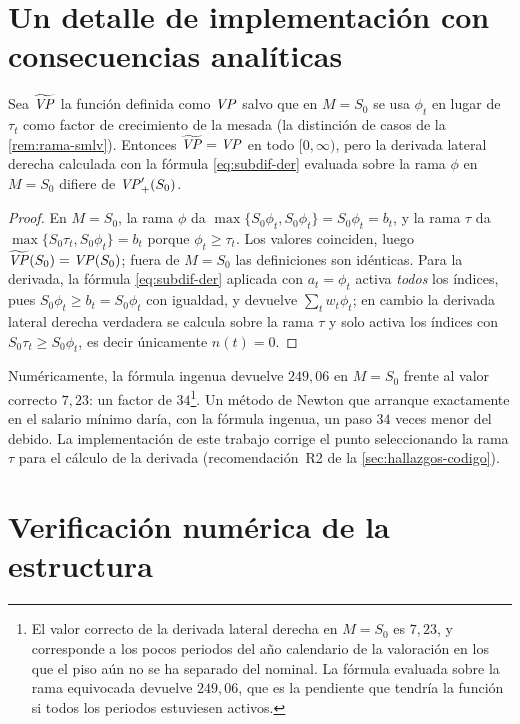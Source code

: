 \section{Un detalle de implementación con consecuencias analíticas}

\begin{proposition}
\label{prop:continuidad-rama}
Sea $\widetilde{\mathit{VP}}$ la función definida como $\mathit{VP}$ salvo que en $M=S_0$ se usa
$\phi_t$ en lugar de $\tau_t$ como factor de crecimiento de la mesada (la
distinción de casos de la \cref{rem:rama-smlv}). Entonces
$\widetilde{\mathit{VP}}=\mathit{VP}$ en todo $[0,\infty)$, pero la derivada lateral derecha
calculada con la fórmula \cref{eq:subdif-der} evaluada sobre la rama $\phi$ en
$M=S_0$ difiere de $\mathit{VP}'_+(S_0)$.
\end{proposition}
\begin{proof}
En $M=S_0$, la rama $\phi$ da $\max\{S_0\phi_t,S_0\phi_t\}=S_0\phi_t=b_t$, y la
rama $\tau$ da $\max\{S_0\tau_t,S_0\phi_t\}=b_t$ porque $\phi_t\ge\tau_t$. Los
valores coinciden, luego $\widetilde{\mathit{VP}}(S_0)=\mathit{VP}(S_0)$; fuera de $M=S_0$ las
definiciones son idénticas. Para la derivada, la fórmula \cref{eq:subdif-der}
aplicada con $a_t=\phi_t$ activa \emph{todos} los índices, pues
$S_0\phi_t\ge b_t=S_0\phi_t$ con igualdad, y devuelve $\sum_tw_t\phi_t$; en cambio
la derivada lateral derecha verdadera se calcula sobre la rama $\tau$ y solo
activa los índices con $S_0\tau_t\ge S_0\phi_t$, es decir únicamente $n(t)=0$.
\end{proof}

Numéricamente, la fórmula ingenua devuelve $249{,}06$ en $M=S_0$ frente al valor
correcto $7{,}23$: un factor de $34$\footnote{El valor correcto de la derivada lateral derecha en $M=S_0$ es $7{,}23$, y corresponde a los pocos periodos del año calendario de la valoración en los que el piso aún no se ha separado del nominal. La fórmula evaluada sobre la rama equivocada devuelve $249{,}06$, que es la pendiente que tendría la función si todos los periodos estuviesen activos.}. Un método de Newton que arranque exactamente
en el salario mínimo daría, con la fórmula ingenua, un paso $34$ veces menor del
debido. La implementación de este trabajo corrige el punto seleccionando la rama
$\tau$ para el cálculo de la derivada (recomendación~R2 de la
\cref{sec:hallazgos-codigo}).

\section{Verificación numérica de la estructura}

